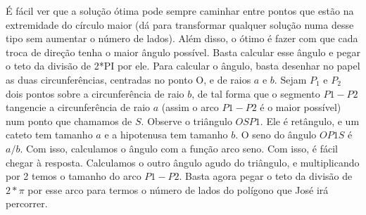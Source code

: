 É fácil ver que a solução ótima pode sempre caminhar entre pontos que estão na extremidade do círculo maior
(dá para transformar qualquer solução numa desse tipo sem aumentar o número de lados). Além disso, o ótimo é
fazer com que cada troca de direção tenha o maior ângulo possível. Basta calcular esse ângulo e pegar o teto
da divisão de 2*PI por ele.
Para calcular o ângulo, basta desenhar no papel as duas circunferências, centradas no ponto O, e de raios
$a$ e $b$. Sejam $P_1$ e $P_2$ dois pontos sobre a circunferência de raio $b$, de tal forma que o segmento
$P1 - P2$ tangencie a circunferência de raio $a$ (assim o arco $P1 - P2$ é o maior possível) num ponto que
chamamos de $S$. Observe o triângulo $OSP1$. Ele é retângulo, e um cateto tem tamanho $a$ e a hipotenusa tem
tamanho $b$. O seno do ângulo $OP1S$ é $a / b$. Com isso, calculamos o ângulo com a função arco seno. Com isso,
é fácil chegar à resposta. Calculamos o outro ângulo agudo do triângulo, e multiplicando por 2 temos o tamanho do
arco $P1 - P2$. Basta agora pegar o teto da divisão de $2*\pi$ por esse arco para termos o número de lados do
polígono que José irá percorrer.
